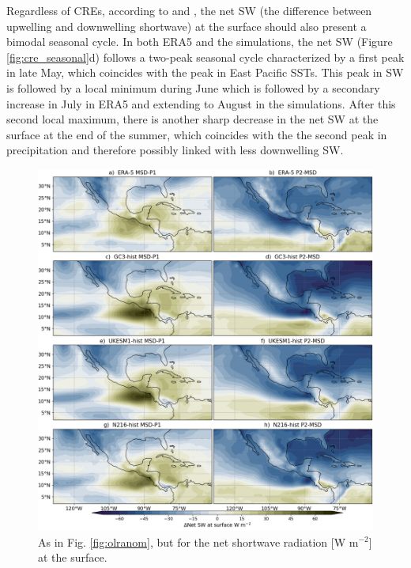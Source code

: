  Regardless of CREs, according to \cite{magana1999} and \cite{karnauskas2013}, the net SW (the difference between upwelling and downwelling shortwave) at the surface should also present a bimodal seasonal cycle.
In both ERA5 and the simulations, the net SW (Figure \ref{fig:cre_seasonal}d) follows a two-peak seasonal cycle characterized by a first peak in late May, which coincides with the peak in East Pacific SSTs. This peak in SW is followed by a local minimum during June which is followed by a secondary increase in July in ERA5 and extending to August in the simulations. After this second local maximum, there is another sharp decrease in the net SW at the surface at the end of the summer, which coincides with the the second peak in precipitation and therefore possibly linked with less downwelling SW. 

\begin{figure}[t!]
\includegraphics[width=\linewidth]{figures/fig4_netswdif_3.png}
\caption[Composite shortave differences with MSD timings]{As in Fig. \ref{fig:olranom}, but for the  net shortwave radiation [W m$^{-2}$] at the surface.}
\label{fig:swnet_diff}
\end{figure}

